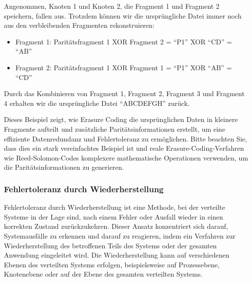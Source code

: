 Angenommen, Knoten 1 und Knoten 2, die Fragment 1 und Fragment 2 speichern, fallen aus. Trotzdem können wir die ursprüngliche Datei immer noch aus den verbleibenden Fragmenten rekonstruieren:
\begin{itemize}
\item Fragment 1: Paritätsfragment 1 XOR Fragment 2 = \enquote{P1} XOR \enquote{CD} = \enquote{AB}
\item Fragment 2: Paritätsfragment 1 XOR Fragment 1 = \enquote{P1} XOR \enquote{AB} = \enquote{CD}
\end{itemize}  
Durch das Kombinieren von Fragment 1, Fragment 2, Fragment 3 und Fragment 4 erhalten wir die ursprüngliche Datei \enquote{ABCDEFGH} zurück.

Dieses Beispiel zeigt, wie Erasure Coding die ursprünglichen Daten in kleinere Fragmente aufteilt und zusätzliche Paritätsinformationen erstellt, um eine effiziente Datenredundanz und Fehlertoleranz zu ermöglichen. Bitte beachten Sie, dass dies ein stark vereinfachtes Beispiel ist und reale Erasure-Coding-Verfahren wie Reed-Solomon-Codes komplexere mathematische Operationen verwenden, um die Paritätsinformationen zu generieren.

\subsubsection{Fehlertoleranz durch Wiederherstellung}

Fehlertoleranz durch Wiederherstellung ist eine Methode, bei der verteilte Systeme in der Lage sind, nach einem Fehler oder Ausfall wieder in einen korrekten Zustand zurückzukehren. Dieser Ansatz konzentriert sich darauf, Systemausfälle zu erkennen und darauf zu reagieren, indem ein Verfahren zur Wiederherstellung des betroffenen Teils des Systems oder der gesamten Anwendung eingeleitet wird. Die Wiederherstellung kann auf verschiedenen Ebenen des verteilten Systems erfolgen, beispielsweise auf Prozessebene, Knotenebene oder auf der Ebene des gesamten verteilten Systems.

